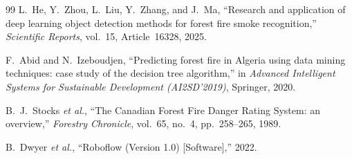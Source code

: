 \documentclass[11pt,a4paper]{report}
\begin{document}
\begin{thebibliography}{99}
L.~He, Y.~Zhou, L.~Liu, Y.~Zhang, and J.~Ma, ``Research and application of deep learning object detection methods for forest fire smoke recognition,'' \emph{Scientific Reports}, vol.~15, Article~16328, 2025.

F.~Abid and N.~Izeboudjen, ``Predicting forest fire in Algeria using data mining techniques: case study of the decision tree algorithm,'' in \emph{Advanced Intelligent Systems for Sustainable Development (AI2SD'2019)}, Springer, 2020.

B.~J.~Stocks \emph{et al.}, ``The Canadian Forest Fire Danger Rating System: an overview,'' \emph{Forestry Chronicle}, vol.~65, no.~4, pp.~258--265, 1989.

B.~Dwyer \emph{et al.}, ``Roboflow (Version 1.0) [Software],'' 2022.



\end{thebibliography}
\end{document}
